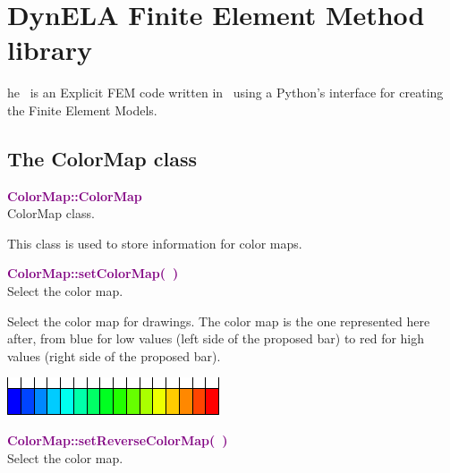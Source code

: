 %
%
%
\chapter{DynELA Finite Element Method library}

\startcontents[chapters]
\printmyminitoc[2]he \DynELA~is an Explicit FEM code written in \Cpp~using a Python's interface for creating the Finite Element Models. 

\section{The ColorMap class}

\textcolor{purple}{\textbf{ColorMap::ColorMap}}\label{ColorMap::ColorMap}\\
ColorMap class.

This class is used to store information for color maps.

\textcolor{purple}{\textbf{ColorMap::setColorMap(~)}}\label{ColorMap::setColorMap()}\\
Select the color map.

Select the color map for drawings.
The color map is the one represented here after, from blue for low values (left side of the proposed bar) to red for high values (right side of the proposed bar).
\begin{center}
\includegraphics{Figures/ProgrammingLanguage/ColorMap}
\end{center}

\textcolor{purple}{\textbf{ColorMap::setReverseColorMap(~)}}\label{ColorMap::setReverseColorMap()}\\
Select the color map.

